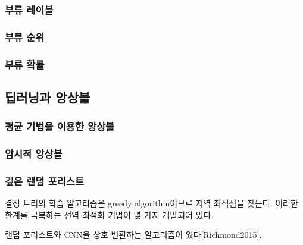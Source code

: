 \documentclass [12pt] {oblivoir}
\let\oldsubsubsection=\subsubsection
\renewcommand{\subsubsection}
{
  \filbreak
  \oldsubsubsection
}
\begin{document}
\subsubsection{부류 레이블}

\subsubsection{부류 순위}

\subsubsection{부류 확률}

\subsection{딥러닝과 앙상블}

\subsubsection{평균 기법을 이용한 앙상블}

\subsubsection{암시적 앙상블}

\subsubsection{깊은 랜덤 포리스트}

결정 트리의 학습 알고리즘은 greedy algorithm이므로 지역 최적점을 찾는다. 이러한 한계를 극복하는 전역 최적화 기법이 몇 가지 개발되어 있다.

\vspace{3mm}
랜덤 포리스트와 CNN을 상호 변환하는 알고리즘이 있다[Richmond2015].
\end{document}
